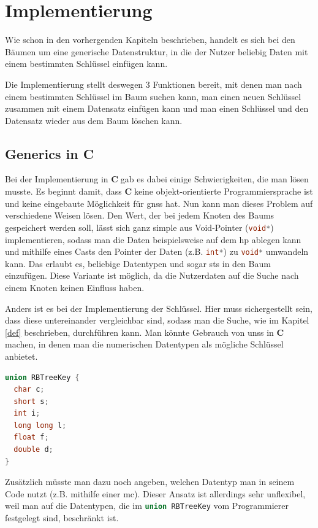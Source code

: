 \documentclass[11pt]{article}
\newcommand{\lstin}[1]{\lstinline[language=C]{#1}}
\newcommand{\cpl}{\textbf{C}$\;$}
\begin{document}
\section{Implementierung}
Wie schon in den vorhergenden Kapiteln beschrieben, handelt es sich bei den Bäumen um eine generische Datenstruktur, in die der Nutzer beliebig Daten mit einem bestimmten Schlüssel einfügen kann.

Die Implementierung stellt deswegen 3 Funktionen bereit, mit denen man nach einem bestimmten Schlüssel im Baum suchen kann, man einen neuen Schlüssel zusammen mit einem Datensatz einfügen kann und man einen Schlüssel und den Datensatz wieder aus dem Baum löschen kann.

\subsection{Generics in C}
Bei der Implementierung in \cpl gab es dabei einige Schwierigkeiten, die man lösen musste. Es beginnt damit, dass \cpl keine objekt-orientierte Programmiersprache ist und keine eingebaute Möglichkeit für \glspl{gns} hat.
Nun kann man dieses Problem auf verschiedene Weisen lösen. Den Wert, der bei jedem Knoten des Baums gespeichert werden soll, lässt sich ganz simple aus Void-Pointer (\lstin{void*}) implementieren, sodass man die Daten beispielsweise auf dem \gls{hp} ablegen kann
und mithilfe eines Casts den Pointer der Daten (z.B. \lstin{int*}) zu \lstin{void*} umwandeln kann. Das erlaubt es, beliebige Datentypen und sogar \gls{sts} in den Baum einzufügen.
Diese Variante ist möglich, da die Nutzerdaten auf die Suche nach einem Knoten keinen Einfluss haben.

Anders ist es bei der Implementierung der Schlüssel. Hier muss sichergestellt sein, dass diese untereinander vergleichbar sind, sodass man die Suche, wie im Kapitel \ref{def} beschrieben, durchführen kann.
Man könnte Gebrauch von \glspl{uns} in \cpl machen, in denen man die numerischen Datentypen als mögliche Schlüssel anbietet.

\begin{lstlisting}[language=C]
union RBTreeKey {
  char c;
  short s;
  int i;
  long long l;
  float f;
  double d;
}
\end{lstlisting}

Zusätzlich müsste man dazu noch angeben, welchen Datentyp man in seinem Code nutzt (z.B. mithilfe einer \gls{mc}). Dieser Ansatz ist allerdings sehr unflexibel, weil man auf die Datentypen, die im \lstin{union RBTreeKey} vom Programmierer festgelegt sind, beschränkt ist.
\end{document}
